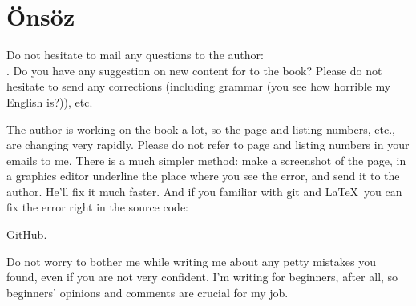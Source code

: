 \part*{Önsöz}


Do not hesitate to mail any questions to the author: \\
\GTT{<\EMAIL>}.
Do you have any suggestion on new content for to the book?
Please do not hesitate to send any corrections (including grammar (you see how horrible my English is?)), etc.

The author is working on the book a lot, so the page and listing numbers, etc., are changing very rapidly.
Please do not refer to page and listing numbers in your emails to me.
There is a much simpler method: make a screenshot of the page, in a graphics editor underline the place where you see the error,
and send it to the author. He'll fix it much faster.
And if you familiar with git and \LaTeX\, you can fix the error right in the source code: 

\href{http://go.yurichev.com/17089}{GitHub}.

Do not worry to bother me while writing me about any petty mistakes you found, even if you are not very confident.
I'm writing for beginners, after all, so beginners' opinions and comments are crucial for my job.
